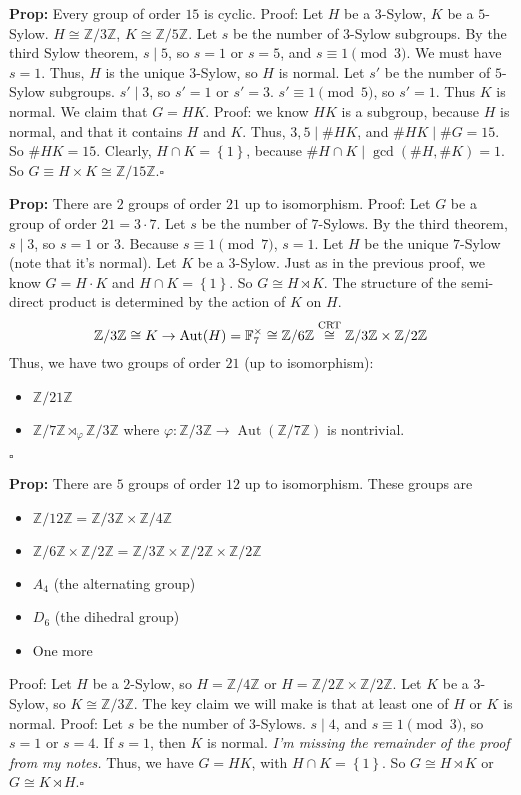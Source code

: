 \documentclass[10pt,letterpaper]{article}
\newcommand{\n}{\hfill\break}
\newcommand{\up}{\vspace{-\baselineskip}}
\newcommand{\hangblock}[2]{\par\noindent\settowidth{\hangindent}{\textbf{#1: }}\textbf{#1: }\!\!\!#2}
\newcommand{\prop}[1]{\hangblock{Prop}{#1}}
\newcommand{\proven}{\;$\square$\n}
\newcommand{\ptxt}[1]{\textrm{\textnormal{#1}}}
\newcommand{\set}[1]{\left\{#1\right\}}
\newcommand{\integers}{\mathbb{Z}}
\newcommand{\Z}{\integers}
\DeclareMathOperator{\Aut}{Aut}
\newcommand{\F}{\mathbb{F}}
\begin{document}
\prop{
	Every group of order $15$ is cyclic.\n
	Proof: Let $H$ be a $3$-Sylow, $K$ be a $5$-Sylow. $H\cong\Z/3\Z$, $K\cong\Z/5\Z$.\n
	Let $s$ be the number of $3$-Sylow subgroups. By the third Sylow theorem, $s\mid{}5$, so $s=1$ or $s=5$, and $s\equiv{}1\pmod{3}$. We must have $s=1$. Thus, $H$ is the unique $3$-Sylow, so $H$ is normal.\n
	Let $s'$ be the number of $5$-Sylow subgroups. $s'\mid{}3$, so $s'=1$ or $s'=3$. $s'\equiv{}1\pmod{5}$, so $s'=1$. Thus $K$ is normal.\n
	\n
	We claim that $G=HK$. Proof: we know $HK$ is a subgroup, because $H$ is normal, and that it contains $H$ and $K$. Thus, $3,5\mid\#HK$, and $\#HK\mid{}\#G=15$. So $\#HK=15$. Clearly, $H\cap{}K=\set{1}$, because $\#H\cap{}K\mid\gcd(\#H,\#K)=1$. So $G\equiv{}H\times{}K\cong\Z/15\Z$.\proven
}

\prop{
	There are $2$ groups of order $21$ up to isomorphism.\n
	Proof: Let $G$ be a group of order $21=3\cdot{}7$. Let $s$ be the number of $7$-Sylows. By the third theorem, $s\mid{}3$, so $s=1$ or $3$. Because $s\equiv{}1\pmod{7}$, $s=1$. Let $H$ be the unique $7$-Sylow (note that it's normal). Let $K$ be a $3$-Sylow. Just as in the previous proof, we know $G=H\cdot{}K$ and $H\cap{}K=\set{1}$. So $G\cong{}H\rtimes{}K$.\n
	The structure of the semi-direct product is determined by the action of $K$ on $H$.
	\[
		\Z/3\Z\cong{}K\to\Aut(H)=\F_{7}^{\times}\cong\Z/6\Z\overset{\ptxt{CRT}}{\cong}\Z/3\Z\times\Z/2\Z
	\]
	Thus, we have two groups of order $21$ (up to isomorphism):
	\begin{itemize}[leftmargin=4\parindent]
		\item $\Z/21\Z$
		\item $\Z/7\Z\rtimes_{\varphi}\Z/3\Z$ where $\varphi:\Z/3\Z\to\Aut(\Z/7\Z)$ is nontrivial.
	\end{itemize}\up\n
	\proven
}

\prop{
	There are $5$ groups of order $12$ up to isomorphism. These groups are
	\begin{itemize}[leftmargin=4\parindent]
		\item $\Z/12\Z=\Z/3\Z\times\Z/4\Z$
		\item $\Z/6\Z\times\Z/2\Z=\Z/3\Z\times\Z/2\Z\times\Z/2\Z$
		\item $A_{4}$ (the alternating group)
		\item $D_{6}$ (the dihedral group)
		\item One more
	\end{itemize}\up\n
	Proof: Let $H$ be a $2$-Sylow, so $H=\Z/4\Z$ or $H=\Z/2\Z\times\Z/2\Z$.\n
	Let $K$ be a $3$-Sylow, so $K\cong\Z/3\Z$.\n
	The key claim we will make is that at least one of $H$ or $K$ is normal.\n
	Proof: Let $s$ be the number of $3$-Sylows. $s\mid{}4$, and $s\equiv{}1\pmod{3}$, so $s=1$ or $s=4$. If $s=1$, then $K$ is normal. \textit{I'm missing the remainder of the proof from my notes.}\n
	Thus, we have $G=HK$, with $H\cap{}K=\set{1}$. So $G\cong{}H\rtimes{}K$ or $G\cong{}K\rtimes{}H$.\proven
}
\end{document}
